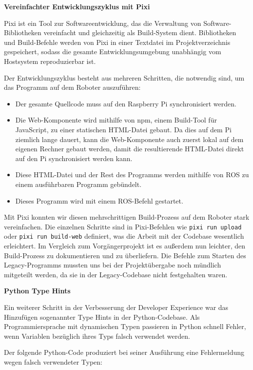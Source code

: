 \textbf{Vereinfachter Entwicklungszyklus mit Pixi}

Pixi ist ein Tool zur Softwareentwicklung, das die Verwaltung von Software-Bibliotheken vereinfacht und gleichzeitig als Build-System dient. Bibliotheken und Build-Befehle werden von Pixi in einer Textdatei im Projektverzeichnis gespeichert, sodass die gesamte Entwicklungsumgebung unabhängig vom Hostsystem reproduzierbar ist.

Der Entwicklungszyklus besteht aus mehreren Schritten, die notwendig sind, um das Programm auf dem Roboter auszuführen:
\begin{itemize}
	\item Der gesamte Quellcode muss auf den Raspberry Pi synchronisiert werden.
	\item Die Web-Komponente wird mithilfe von npm, einem Build-Tool für JavaScript, zu einer statischen HTML-Datei gebaut. Da dies auf dem Pi ziemlich lange dauert, kann die Web-Komponente auch zuerst lokal auf dem eigenen Rechner gebaut werden, damit die resultierende HTML-Datei direkt auf den Pi synchronisiert werden kann.
	\item Diese HTML-Datei und der Rest des Programms werden mithilfe von ROS zu einem ausführbaren Programm gebündelt.
	\item Dieses Programm wird mit einem ROS-Befehl gestartet.
\end{itemize}

Mit Pixi konnten wir diesen mehrschrittigen Build-Prozess auf dem Roboter stark vereinfachen. Die einzelnen Schritte sind in Pixi-Befehlen wie \texttt{pixi run upload} oder \texttt{pixi run build-web} definiert, was die Arbeit mit der Codebase wesentlich erleichtert. Im Vergleich zum Vorgängerprojekt ist es außerdem nun leichter, den Build-Prozess zu dokumentieren und zu überliefern. Die Befehle zum Starten des Legacy-Programms mussten uns bei der Projektübergabe noch mündlich mitgeteilt werden, da sie in der Legacy-Codebase nicht festgehalten waren. 

\textbf{Python Type Hints}

Ein weiterer Schritt in der Verbesserung der Developer Experience war das Hinzufügen sogenannter Type Hints in der Python-Codebase. Als Programmiersprache mit dynamischen Typen passieren in Python schnell Fehler, wenn Variablen bezüglich ihres Typs falsch verwendet werden.

Der folgende Python-Code produziert bei seiner Ausführung eine Fehlermeldung wegen falsch verwendeter Typen:

